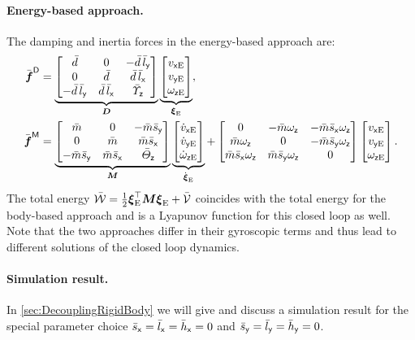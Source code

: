 \paragraph{Energy-based approach.}
The damping and inertia forces in the energy-based approach are:
\begin{subequations}
\begin{align}
 \genForceDissC &= \underbrace{\begin{bmatrix} \dc & 0 &-\dc\,\lcy \\ 0 & \dc & \dc\,\lcx \\ -\dc\,\lcy & \dc\,\lcx & \sigcz \end{bmatrix}}_{\sysDissMat}
 \underbrace{\begin{bmatrix} \vxE \\ \vyE \\ \wzE \end{bmatrix}}_{\sysVelE},
\\
 \genForceInertiaC &= \underbrace{\begin{bmatrix} \mc & 0 & -\mc\scy \\ 0 & \mc & \mc\scx \\ -\mc\scy & \mc\scx & \Jcz \end{bmatrix}}_{\sysInertiaMat}
 \underbrace{\begin{bmatrix} \vxEd \\ \vyEd \\ \wzEd \end{bmatrix}}_{\sysVelEd}
 + \begin{bmatrix} 0 & -\mc\wz & -\mc\scx\wz \\ \mc\wz & 0 & -\mc\scy\wz \\ \mc\scx\wz & \mc\scy\wz & 0 \end{bmatrix}
 \begin{bmatrix} \vxE \\ \vyE \\ \wzE \end{bmatrix}.
\end{align} 
\end{subequations}
The total energy $\totalEnergyC = \tfrac{1}{2} \sysVelE^\top \sysInertiaMat \sysVelE + \potentialEnergyC$ coincides with the total energy for the body-based approach and is a Lyapunov function for this closed loop as well.
Note that the two approaches differ in their gyroscopic terms and thus lead to different solutions of the closed loop dynamics.

\paragraph{Simulation result.}
In \autoref{sec:DecouplingRigidBody} we will give and discuss a simulation result for the special parameter choice $\scx=\lcx=\hcx=0$ and $\scy=\lcy=\hcy=0$.

